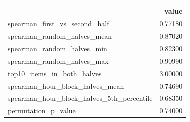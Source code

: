 \begin{tabular}{lr}
\toprule
 & value \\
\midrule
spearman\_first\_vs\_second\_half & 0.77180 \\
spearman\_random\_halves\_mean & 0.87020 \\
spearman\_random\_halves\_min & 0.82300 \\
spearman\_random\_halves\_max & 0.90990 \\
top10\_items\_in\_both\_halves & 3.00000 \\
spearman\_hour\_block\_halves\_mean & 0.74690 \\
spearman\_hour\_block\_halves\_5th\_percentile & 0.68350 \\
permutation\_p\_value & 0.74000 \\
\bottomrule
\end{tabular}
